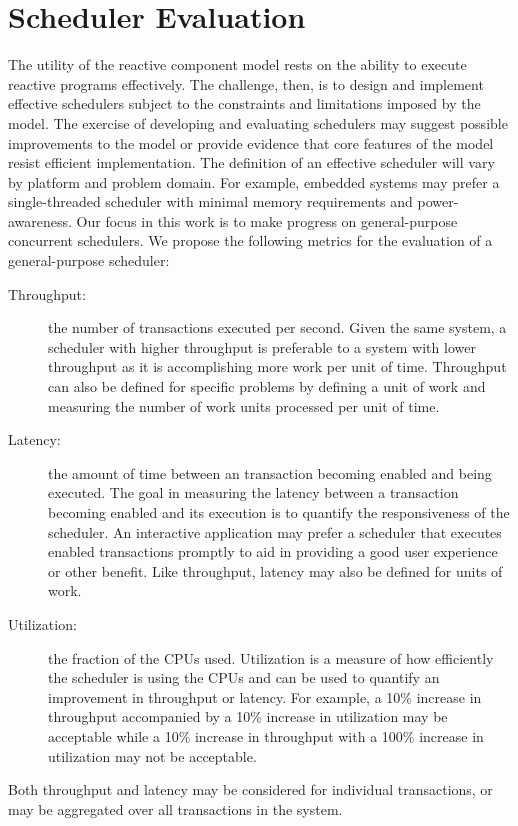 \section{Scheduler Evaluation}

The utility of the reactive component model rests on the ability to execute reactive programs effectively.
The challenge, then, is to design and implement effective schedulers subject to the constraints and limitations imposed by the model.
The exercise of developing and evaluating schedulers may suggest possible improvements to the model or provide evidence that core features of the model resist efficient implementation.
The definition of an effective scheduler will vary by platform and problem domain.
For example, embedded systems may prefer a single-threaded scheduler with minimal memory requirements and power-awareness.
Our focus in this work is to make progress on general-purpose concurrent schedulers.
We propose the following metrics for the evaluation of a general-purpose scheduler:
\begin{description}
\item[Throughput:] the number of transactions executed per second.
Given the same system, a scheduler with higher throughput is preferable to a system with lower throughput as it is accomplishing more work per unit of time.
Throughput can also be defined for specific problems by defining a unit of work and measuring the number of work units processed per unit of time.
\item[Latency:] the amount of time between an transaction becoming enabled and being executed.
The goal in measuring the latency between a transaction becoming enabled and its execution is to quantify the responsiveness of the scheduler.
An interactive application may prefer a scheduler that executes enabled transactions promptly to aid in providing a good user experience or other benefit.
Like throughput, latency may also be defined for units of work.
\item[Utilization:] the fraction of the CPUs used.
Utilization is a measure of how efficiently the scheduler is using the CPUs and can be used to quantify an improvement in throughput or latency.
For example, a 10\% increase in throughput accompanied by a 10\% increase in utilization may be acceptable while a 10\% increase in throughput with a 100\% increase in utilization may not be acceptable.
\end{description}
Both throughput and latency may be considered for individual transactions, or may be aggregated over all transactions in the system.

